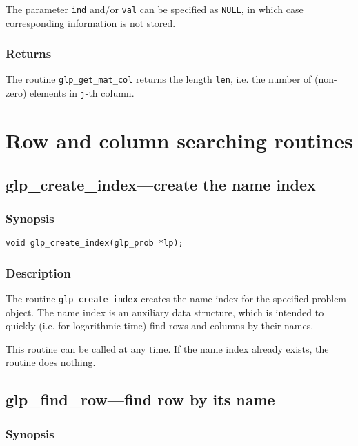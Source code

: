 The parameter \verb|ind| and/or \verb|val| can be specified as
\verb|NULL|, in which case corresponding information is not stored.

\subsubsection*{Returns}

The routine \verb|glp_get_mat_col| returns the length \verb|len|, i.e.
the number of (non-zero) elements in \verb|j|-th column.


\newpage

\section{Row and column searching routines}

\subsection{glp\_create\_index---create the name index}

\subsubsection*{Synopsis}

\begin{verbatim}
void glp_create_index(glp_prob *lp);
\end{verbatim}

\subsubsection*{Description}

The routine \verb|glp_create_index| creates the name index for the
specified problem object. The name index is an auxiliary data structure,
which is intended to quickly (i.e. for logarithmic time) find rows and
columns by their names.

This routine can be called at any time. If the name index already
exists, the routine does nothing.

\subsection{glp\_find\_row---find row by its name}

\subsubsection*{Synopsis}

